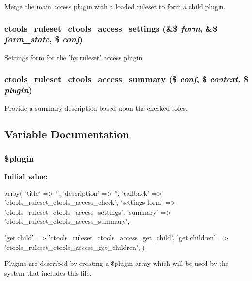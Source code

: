 \label{ruleset_8inc_ac04d7c43fa756f79ede66680cf832fb1}
Merge the main access plugin with a loaded ruleset to form a child plugin. \hypertarget{ruleset_8inc_a407a84f2dfed6de7b2263764110ccb9b}{
\subsubsection[{ctools\_\-ruleset\_\-ctools\_\-access\_\-settings}]{\setlength{\rightskip}{0pt plus 5cm}ctools\_\-ruleset\_\-ctools\_\-access\_\-settings (\&\$ {\em form}, \/  \&\$ {\em form\_\-state}, \/  \$ {\em conf})}}
\label{ruleset_8inc_a407a84f2dfed6de7b2263764110ccb9b}
Settings form for the 'by ruleset' access plugin \hypertarget{ruleset_8inc_a13856bc486eaf9b3a72905515eb79fb8}{
\subsubsection[{ctools\_\-ruleset\_\-ctools\_\-access\_\-summary}]{\setlength{\rightskip}{0pt plus 5cm}ctools\_\-ruleset\_\-ctools\_\-access\_\-summary (\$ {\em conf}, \/  \$ {\em context}, \/  \$ {\em plugin})}}
\label{ruleset_8inc_a13856bc486eaf9b3a72905515eb79fb8}
Provide a summary description based upon the checked roles. 

\subsection{Variable Documentation}
\hypertarget{ruleset_8inc_ada8a7130088351710bb02ed622d6bf65}{
\subsubsection[{\$plugin}]{\setlength{\rightskip}{0pt plus 5cm}\$plugin}}
\label{ruleset_8inc_ada8a7130088351710bb02ed622d6bf65}
{\bfseries Initial value:}
\begin{DoxyCode}
 array(
  'title' => '',
  'description' => '',
  'callback' => 'ctools_ruleset_ctools_access_check',
  'settings form' => 'ctools_ruleset_ctools_access_settings',
  'summary' => 'ctools_ruleset_ctools_access_summary',

  
  
  'get child' => 'ctools_ruleset_ctools_access_get_child',
  'get children' => 'ctools_ruleset_ctools_access_get_children',
)
\end{DoxyCode}
Plugins are described by creating a \$plugin array which will be used by the system that includes this file. 